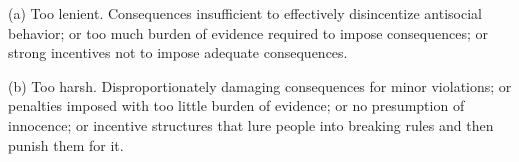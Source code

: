 \documentclass[12pt]{article}
\begin{document}
\begin{enumerate}
  (a) Too lenient. Consequences insufficient to effectively disincentize antisocial behavior; or too much burden of evidence required to impose consequences; or strong incentives not to impose adequate consequences.

  (b) Too harsh. Disproportionately damaging consequences for minor violations; or penalties imposed with too little burden of evidence; or no presumption of innocence; or incentive structures that lure people into breaking rules and then punish them for it.
  
  
\end{enumerate}
\end{document}
